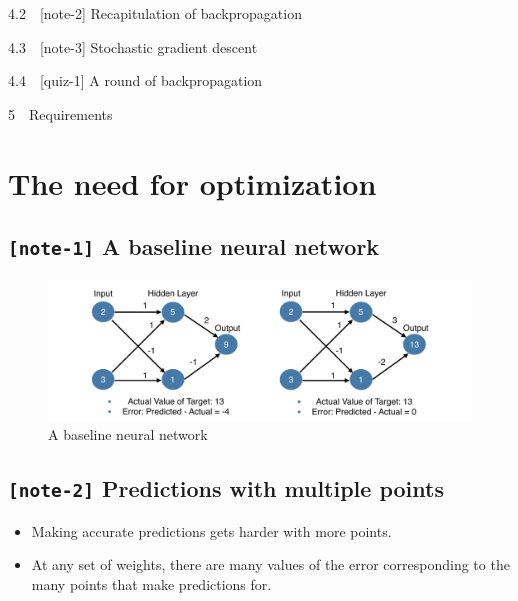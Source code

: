 \documentclass[11pt, twoside]{article}
\begin{document}
{{4.2~~}{[}note-2{]} Recapitulation of backpropagation}

{{4.3~~}{[}note-3{]} Stochastic gradient descent}

{{4.4~~}{[}quiz-1{]} A round of backpropagation}

{{5~~}Requirements}

    \hypertarget{the-need-for-optimization}{%
\section{The need for optimization}\label{the-need-for-optimization}}

    \hypertarget{note-1-a-baseline-neural-network}{%
\subsection{\texorpdfstring{\texttt{{[}note-1{]}} A baseline neural
network}{{[}note-1{]} A baseline neural network}}\label{note-1-a-baseline-neural-network}}

\begin{figure}
\centering
\includegraphics{../Figures/1. A baseline neural network.jpg}
\caption{A baseline neural network}
\end{figure}

    \hypertarget{note-2-predictions-with-multiple-points}{%
\subsection{\texorpdfstring{\texttt{{[}note-2{]}} Predictions with
multiple
points}{{[}note-2{]} Predictions with multiple points}}\label{note-2-predictions-with-multiple-points}}

\begin{itemize}
\item
  Making accurate predictions gets harder with more points.
\item
  At any set of weights, there are many values of the error
  corresponding to the many points that make predictions for.
\end{itemize}
\end{document}
